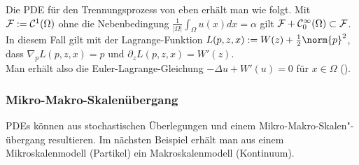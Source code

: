\linie

\begin{Bsp}
    Die PDE für den Trennungsprozess von eben erhält man wie folgt.
    Mit $\mathcal{F} := \mathcal{C}^1(\Omega)$ ohne die Nebenbedingung
    $\frac{1}{|\Omega|} \int_\Omega u(x)dx = \alpha$
    gilt $\mathcal{F} + \mathcal{C}_0^\infty(\Omega) \subset \mathcal{F}$.
    In diesem Fall gilt mit der Lagrange-Funktion $L(p, z, x) := W(z) + \frac{1}{2} \norm{p}^2$,
    dass $\nabla_p L(p, z, x) = p$ und $\partial_z L(p, z, x) = W'(z)$.\\
    Man erhält also die Euler-Lagrange-Gleichung
    $-\Delta u + W'(u) = 0$ für $x \in \Omega$
    ().
\end{Bsp}

\subsubsection{%
    Mikro-Makro-Skalenübergang%
}

\begin{Bem}
    PDEs können aus stochastischen Überlegungen und einem Mikro-Makro-Skalen"-übergang resultieren.
    Im nächsten Beispiel erhält man aus einem Mikroskalenmodell (Partikel) ein
    Makroskalenmodell (Kontinuum).
\end{Bem}

\linie

